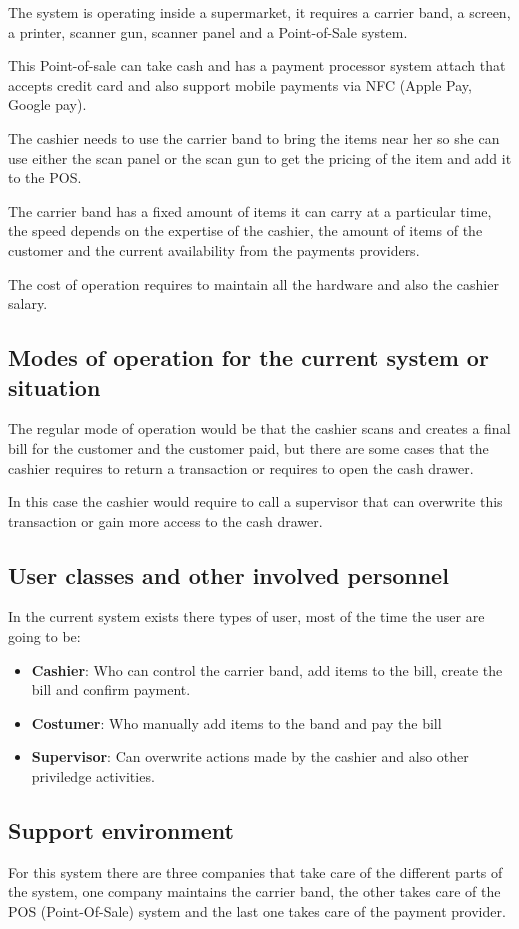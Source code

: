 The system is operating inside a supermarket, it requires a carrier band, a 
screen, a printer, scanner gun, scanner panel and a 
Point-of-Sale system.\newline

\noindent
This Point-of-sale can take cash and has a payment processor system 
attach that accepts credit card and also support mobile payments via 
NFC (Apple Pay, Google pay).\newline

\noindent 
The cashier needs to use the carrier band to bring the items near her so she 
can use either the scan panel or the scan gun to get the pricing of the item 
and add it to the POS.\newline

\noindent 
The carrier band has a fixed amount of items it can carry at a particular time, 
the speed depends on the expertise of the cashier, the amount of items of the 
customer and the current availability from the payments providers.\newline

\noindent 
The cost of operation requires to maintain all the hardware and also the 
cashier salary.

\subsection{Modes of operation for the current system or situation}

The regular mode of operation would be that the cashier scans and creates a 
final bill for the customer and the customer paid, but there are some 
cases that the cashier requires to return a transaction or requires to open 
the cash drawer. \newline

\noindent 
In this case the cashier would require to call a supervisor that can overwrite 
this transaction or gain more access to the cash drawer. \newline

\pagebreak

\subsection{User classes and other involved personnel}
In the current system exists there types of user, most of the time the user 
are going to be:

\begin{itemize}
	\item \textbf{Cashier}: Who can control the carrier band, add items to the 
    bill, create the bill and confirm payment.
	\item \textbf{Costumer}: Who manually add items to the band and pay the bill
	\item \textbf{Supervisor}: Can overwrite actions made by the cashier 
	and also other priviledge activities.
\end{itemize}

\subsection{Support environment}

\noindent 
For this system there are three companies that take care of the different 
parts of the system, one company maintains the carrier band, the other takes 
care of the POS (Point-Of-Sale) system and the last one takes care of the payment provider.